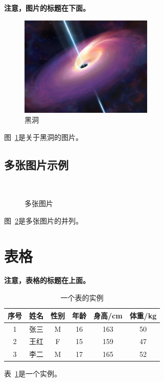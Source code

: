 \textbf{注意，图片的标题在下面。}
\begin{figure}[!ht]
    \centering
    \includegraphics[width=2.5in]{images/blackhole.jpeg}
    \caption{黑洞}
    \label{fig:blackhole}
\end{figure}
图~\ref{fig:blackhole}是关于黑洞的图片。

\subsection{多张图片示例}

\begin{figure}[!ht]
    \centering
    \hfill
    \\
    \hfill
    \caption{多张图片}
    \label{fig:example}
\end{figure}
图~\ref{fig:example}是多张图片的并列。


\section{表格}

\textbf{注意，表格的标题在上面。}
\begin{table}[!ht]
\centering
\caption{一个表的实例}
\begin{tabular}{cccccc}
    \toprule
    序号 & 姓名 & 性别 & 年龄 & 身高/cm & 体重/kg \\
    \midrule
    1 & 张三 & M & 16 & 163 & 50 \\
    2 & 王红 & F & 15 & 159 & 47 \\
    3 & 李二 & M & 17 & 165 & 52 \\
    \bottomrule
\end{tabular}
\label{tab:tabobj}
\end{table}
表~\ref{tab:tabobj}是一个实例。


